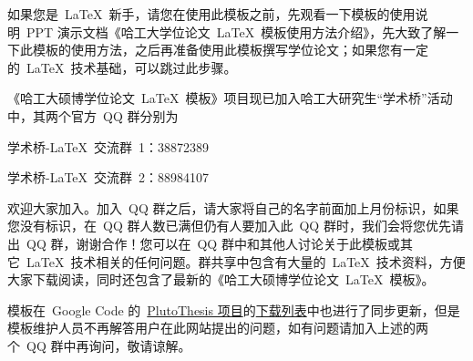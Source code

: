 

如果您是~\LaTeX~新手，请您在使用此模板之前，先观看一下模板的使用说明~PPT 演示文档《哈工大学位论文~\LaTeX~模板使用方法介绍》，先大致了解一下此模板的使用方法，之后再准备使用此模板撰写学位论文；如果您有一定的~\LaTeX~技术基础，可以跳过此步骤\cite{xin1994}。

《哈工大硕博学位论文~\LaTeX~模板》项目现已加入哈工大研究生“学术桥”活动中，其两个官方~QQ 群分别为

\centerline{学术桥-\LaTeX~交流群~1：38872389}
\centerline{学术桥-\LaTeX~交流群~2：88984107}
\noindent 欢迎大家加入。加入~QQ 群之后，请大家将自己的名字前面加上月份标识，如果您没有标识，在~QQ 群人数已满但仍有人要加入此~QQ 群时，我们会将您优先请出~QQ 群，谢谢合作！您可以在~QQ 群中和其他人讨论关于此模板或其它~\LaTeX~技术相关的任何问题。群共享中包含有大量的~\LaTeX~技术资料，方便大家下载阅读，同时还包含了最新的《哈工大硕博学位论文~\LaTeX~模板》。

模板在~Google Code 的~\href{http://code.google.com/p/plutothesis/}{PlutoThesis 项目}的\href{http://code.google.com/p/plutothesis/downloads/list}{下载列表}中也进行了同步更新，但是模板维护人员不再解答用户在此网站提出的问题，如有问题请加入上述的两个~QQ 群中再询问，敬请谅解。
